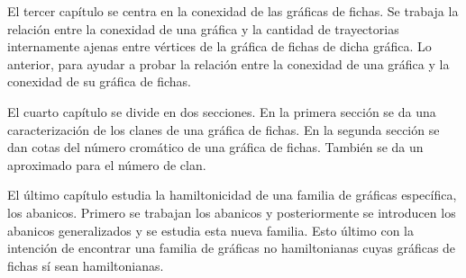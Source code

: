 El tercer cap\'itulo se centra en la conexidad de las gr\'aficas de fichas. Se
trabaja la relaci\'on entre la conexidad de una gr\'afica y la cantidad de
trayectorias internamente ajenas entre v\'ertices de la gr\'afica de fichas de
dicha gr\'afica. Lo anterior, para ayudar a probar la relaci\'on entre la
conexidad de una gr\'afica y la conexidad de su gr\'afica de fichas.

El cuarto cap\'itulo se  divide en dos secciones. En la primera secci\'on se da
una caracterizaci\'on de los clanes de una gr\'afica de fichas. En la segunda
secci\'on se dan cotas del n\'umero crom\'atico de una gr\'afica de fichas.
Tambi\'en se da un aproximado para el n\'umero de clan.

El \'ultimo cap\'itulo estudia la hamiltonicidad de una familia de gr\'aficas
espec\'ifica, los abanicos. Primero se trabajan los abanicos y posteriormente se
introducen los abanicos generalizados y se estudia esta nueva familia. Esto
\'ultimo con la intenci\'on de encontrar una familia de gr\'aficas no
hamiltonianas cuyas gr\'aficas de fichas s\'i sean hamiltonianas.